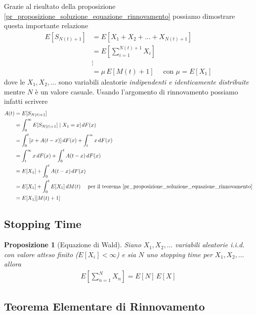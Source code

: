 \documentclass{article}
\newtheorem{proposizione}{Proposizione}[section]
\begin{document}
Grazie al risultato della proposizione \ref{pr_proposizione_soluzione_equazione_rinnovamento} possiamo dimostrare questa importante relazione
\begin{align*}
E[S_{N(t) + 1}] &= E[X_1 + X_2 + \hdots + X_{N(t) + 1}]\\
&= E[\sum_{i = 1}^{N(t) + 1} X_i]\\
&\vdots\\
&= \mu\,E[M(t) + 1]\quad \text{ con } \mu = E[X_1]
\end{align*}
dove le $X_1,X_2,\hdots$ sono variabili aleatorie \emph{indipendenti e identicamente distribuite} mentre $N$ è un valore casuale.
Usando l'argomento di rinnovamento possiamo infatti scrivere
\begin{align*}
A(t) &= E[S_{N(t) + 1}]\\
&=\int_0^{\infty}E[S_{N(t)+1}] \mid X_1 = x]\,dF(x)\\
&=\int_0^t [x + A(t-x)]\,dF(x) + \int_t^{\infty}x\,dF(x)\\
&=\int_t^{\infty}x\,dF(x)+\int_0^tA(t-x)\,dF(x)\\
&=E[X_1]+\int_0^tA(t-x)\,dF(x)\\
&=E[X_1]+\int_0^tE[X_1]\,dM(t) \quad \text{ per il teorema \ref{pr_proposizione_soluzione_equazione_rinnovamento}}\\
&=E[X_1][M(t) + 1]
\end{align*}

\subsection{Stopping Time}

\begin{proposizione}[Equazione di Wald]
Siano $X_1,X_2,\hdots$ variabili aleatorie i.i.d. con valore atteso finito ($E[X_i] < \infty$) e sia $N$ uno \emph{stopping time} per $X_1,X_2,\hdots$ allora
\begin{align*}
E[\sum_{n=1}^{N} X_n] = E[N]\,E[X]
\end{align*}
\end{proposizione}

\subsection{Teorema Elementare di Rinnovamento}
\end{document}
